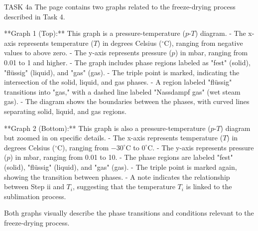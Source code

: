 TASK 4a  
The page contains two graphs related to the freeze-drying process described in Task 4.  

**Graph 1 (Top):**  
This graph is a pressure-temperature (\( p \)-\( T \)) diagram.  
- The x-axis represents temperature (\( T \)) in degrees Celsius (\( ^\circ \text{C} \)), ranging from negative values to above zero.  
- The y-axis represents pressure (\( p \)) in mbar, ranging from 0.01 to 1 and higher.  
- The graph includes phase regions labeled as "fest" (solid), "flüssig" (liquid), and "gas" (gas).  
- The triple point is marked, indicating the intersection of the solid, liquid, and gas phases.  
- A region labeled "flüssig" transitions into "gas," with a dashed line labeled "Nassdampf gas" (wet steam gas).  
- The diagram shows the boundaries between the phases, with curved lines separating solid, liquid, and gas regions.  

**Graph 2 (Bottom):**  
This graph is also a pressure-temperature (\( p \)-\( T \)) diagram but zoomed in on specific details.  
- The x-axis represents temperature (\( T \)) in degrees Celsius (\( ^\circ \text{C} \)), ranging from \(-30^\circ \text{C}\) to \( 0^\circ \text{C} \).  
- The y-axis represents pressure (\( p \)) in mbar, ranging from 0.01 to 10.  
- The phase regions are labeled "fest" (solid), "flüssig" (liquid), and "gas" (gas).  
- The triple point is marked again, showing the transition between phases.  
- A note indicates the relationship between Step ii and \( T_i \), suggesting that the temperature \( T_i \) is linked to the sublimation process.  

Both graphs visually describe the phase transitions and conditions relevant to the freeze-drying process.